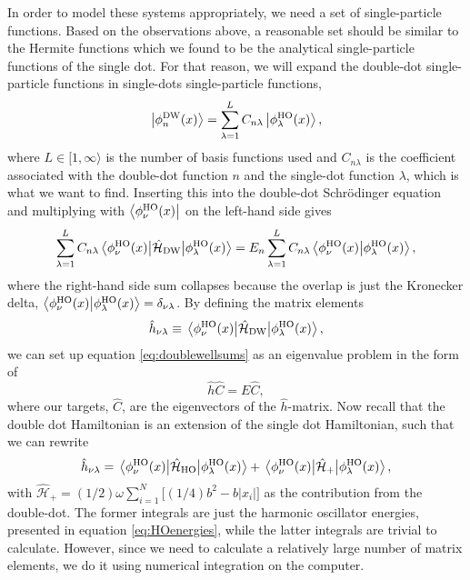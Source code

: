 In order to model these systems appropriately, we need a set of single-particle functions. Based on the observations above, a reasonable set should be similar to the Hermite functions which we found to be the analytical single-particle functions of the single dot. For that reason, we will expand the double-dot single-particle functions in single-dots single-particle functions,
\begin{equation}
\ket{\phi_n^{\text{DW}}(x)}=\sum_{\lambda=1}^{L}C_{n\lambda}\ket{\phi_{\lambda}^{\text{HO}}(x)},
\end{equation}
where $L\in[1,\infty\rangle$ is the number of basis functions used and $C_{n\lambda}$ is the coefficient associated with the double-dot function $n$ and the single-dot function $\lambda$, which is what we want to find. Inserting this into the double-dot Schrödinger equation and multiplying with $\bra{\phi_{\nu}^{\text{HO}}(x)}$ on the left-hand side gives
\begin{equation}
\label{eq:doublewellsums}
\sum_{\lambda=1}^LC_{n\lambda}\mel{\phi_{\nu}^{\text{HO}}(x)}{\hat{\mathcal{H}}_{\text{DW}}}{\phi_{\lambda}^{\text{HO}}(x)}=E_n\sum_{\lambda=1}^LC_{n\lambda}\braket{\phi_{\nu}^{\text{HO}}(x)}{\phi_{\lambda}^{\text{HO}}(x)},
\end{equation}
where the right-hand side sum collapses because the overlap is just the Kronecker delta, $\braket{\phi_{\nu}^{\text{HO}}(x)}{\phi_{\lambda}^{\text{HO}}(x)}=\delta_{\nu\lambda}$. By defining the matrix elements
\begin{equation}
\hat{h}_{\nu\lambda}\equiv\mel{\phi_{\nu}^{\text{HO}}(x)}{\hat{\mathcal{H}}_{\text{DW}}}{\phi_{\lambda}^{\text{HO}}(x)},
\end{equation}
we can set up equation \eqref{eq:doublewellsums} as an eigenvalue problem in the form of
\begin{equation}
\hat{h}\hat{C}=E\hat{C},
\end{equation}
where our targets, $\hat{C}$, are the eigenvectors of the $\hat{h}$-matrix. Now recall that the double dot Hamiltonian is an extension of the single dot Hamiltonian, such that we can rewrite
\begin{equation}
\hat{h}_{\nu\lambda}=\mel{\phi_{\nu}^{\text{HO}}(x)}{\hat{\mathcal{H}}_{\text{HO}}}{\phi_{\lambda}^{\text{HO}}(x)}+\mel{\phi_{\nu}^{\text{HO}}(x)}{\hat{\mathcal{H}}_{\text{+}}}{\phi_{\lambda}^{\text{HO}}(x)},
\end{equation}
with $\hat{\mathcal{H}}_{\text{+}}=(1/2)\omega\sum_{i=1}^N\Big[(1/4)b^2-b|x_i|\Big]$ as the contribution from the double-dot. The former integrals are just the harmonic oscillator energies, presented in equation \eqref{eq:HOenergies}, while the latter integrals are trivial to calculate. However, since we need to calculate a relatively large number of matrix elements, we do it using numerical integration on the computer. \fi

